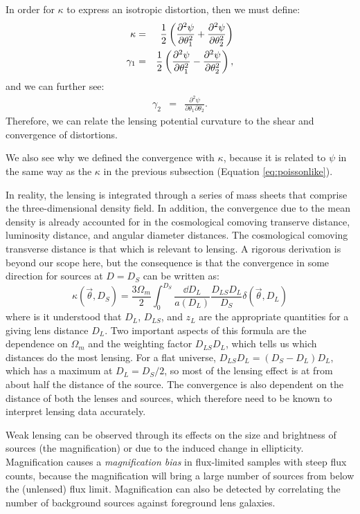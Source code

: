 In order for $\kappa$ to express an isotropic distortion, then we must
define:
\begin{eqnarray}
\kappa &=& \frac{1}{2}\left(
\frac{\partial^2\psi}{\partial\theta_1^2} +
\frac{\partial^2\psi}{\partial\theta_2^2}\right) \cr
\gamma_1 &=& \frac{1}{2} \left(
\frac{\partial^2\psi}{\partial\theta_1^2} -
\frac{\partial^2\psi}{\partial\theta_2^2}\right),
\end{eqnarray}
and we can further see:
\begin{eqnarray}
\gamma_2 &=& \frac{\partial^2\psi}{\partial\theta_1 \partial\theta_2}.
\end{eqnarray}
Therefore, we can relate the lensing potential curvature to the shear
and convergence of distortions.

We also see why we defined the convergence with $\kappa$, because it
is related to $\psi$ in the same way as the $\kappa$ in the previous
subsection (Equation \ref{eq:poissonlike}). 

In reality, the lensing is integrated through a series of mass sheets
that comprise the three-dimensional density field. In addition, the
convergence due to the mean density is already accounted for in the
cosmological comoving transerve distance, luminosity distance, and
angular diameter distances. The cosmological comoving transverse
distance is that which is relevant to lensing. A rigorous derivation
is beyond our scope here, but the consequence is that the convergence
in some direction for sources at $D=D_S$ can be written as:
\begin{equation}
\kappa(\vec{\theta}, D_S)
= \frac{3 \Omega_m}{2} \int_0^{D_S} \frac{\dd{D_L}}{a(D_L)}
\frac{D_{LS} D_L}{D_S} \delta(\vec{\theta}, D_L)
\end{equation}
where is it understood that $D_L$, $D_{LS}$, and $z_L$ are the
appropriate quantities for a giving lens distance $D_L$. Two important
aspects of this formula are the dependence on $\Omega_m$ and the
weighting factor $D_{LS} D_L$, which tells us which distances do the
most lensing. For a flat universe, $D_{LS}D_L = (D_S - D_L)D_L$, which
has a maximum at $D_L = D_S/2$, so most of the lensing effect is at
from about half the distance of the source. The convergence is also
dependent on the distance of both the lenses and sources, which
therefore need to be known to interpret lensing data accurately.

Weak lensing can be observed through its effects on the size and
brightness of sources (the magnification) or due to the induced change
in ellipticity. Magnification causes a {\it magnification bias} in
flux-limited samples with steep flux counts, because the magnification
will bring a large number of sources from below the (unlensed) flux
limit.  Magnification can also be detected by correlating the number
of background sources against foreground lens galaxies.

